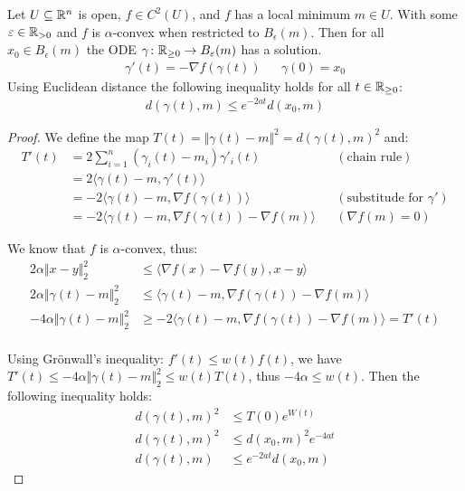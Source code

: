 \documentclass[british]{mscs-project}
\begin{document}
\begin{lemma}
 \label{lemma:blabla}
 Let $U \subseteq \mathbb{R}^n$ is open, $f \in C^2(U)$, and $f$ has a local minimum $m \in U$. With some $\varepsilon \in \mathbb{R}_{>0}$ and $f$ is $\alpha$-convex when restricted to $B_\epsilon(m)$. Then for all $x_0 \in B_\epsilon(m)$ the ODE $\gamma \colon \mathbb{R}_{\geq 0} \to B_\varepsilon(m)$ has a solution.
 \begin{align*}
   \gamma'(t) = -\nabla f(\gamma(t)) & & \gamma(0) = x_0
 \end{align*}
 Using Euclidean distance the following inequality holds for all $t \in \mathbb{R}_{\geq 0}$:
 \begin{align*}
   d(\gamma(t), m) \leq e^{-2at}d(x_0,m)
 \end{align*}
\end{lemma}
\begin{proof} We define the map $T(t) = \Vert\gamma(t) - m \Vert^2 = d(\gamma(t),m)^2$ and:
\begin{align*}
  T'(t) &= 2 \sum^n_{i=1}(\gamma_i(t) - m_i)  \gamma'_i(t) && (\text{chain rule}) \\
 &= 2 \langle \gamma(t) - m, \gamma'(t) \rangle && \\
 &= -2 \langle \gamma(t) - m, \nabla f(\gamma(t)) \rangle && (\text{substitude for } \gamma') \\
 &= -2 \langle \gamma(t) - m, \nabla f(\gamma(t)) - \nabla f(m) \rangle && (\nabla f(m) = 0)
\end{align*}


We know that $f$ is $\alpha$-convex, thus:
\begin{align*}
 2\alpha \Vert x - y \Vert ^2_2 &\leq \langle \nabla f(x) - \nabla f(y), x - y \rangle \\
 2\alpha \Vert \gamma(t) - m \Vert ^2_2 &\leq \langle \gamma(t) - m, \nabla f(\gamma(t)) - \nabla f(m) \rangle \\
 -4\alpha \Vert \gamma(t) - m \Vert ^2_2 &\geq -2\langle \gamma(t) - m, \nabla f(\gamma(t)) - \nabla f(m) \rangle = T'(t) \\
\end{align*}


Using Gr\"onwall's inequality: $f'(t) \leq w(t)f(t)$, we have $T'(t) \leq -4\alpha \Vert \gamma(t) - m \Vert ^2_2  \leq w(t)T(t)$, thus $-4 \alpha \leq w(t)$. Then the following inequality holds:
\begin{align*}
 d(\gamma(t),m)^2 &\leq T(0) e^{W(t)}  \\
 d(\gamma(t),m)^2 &\leq d(x_0, m)^2 e^{-4at}  \\
 d(\gamma(t),m) &\leq e^{-2at}d(x_0, m)
\end{align*}
\end{proof}
\end{document}
